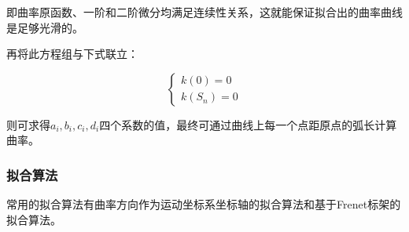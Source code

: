 \begin{enumerate}[label=(\Alph*)]
    即曲率原函数、一阶和二阶微分均满足连续性关系，这就能保证拟合出的曲率曲线是足够光滑的。

    再将此方程组与下式联立：

    \begin{equation}
    \left\{
        \begin{array}{lr}
        k(0) = 0
    \\
        k(S_n) = 0
        \end{array}
    \right.
    \end{equation}

    则可求得$a_i, b_i, c_i, d_i$四个系数的值，最终可通过曲线上每一个点距原点的弧长计算曲率。
\end{enumerate}

\subsubsection{拟合算法}

常用的拟合算法有曲率方向作为运动坐标系坐标轴的拟合算法和基于Frenet标架的拟合算法。

